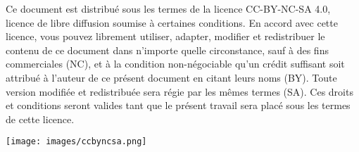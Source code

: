 \vspace{12cm}


Ce document est distribu\'{e} sous les termes de la licence CC-BY-NC-SA 4.0, licence de libre diffusion soumise à certaines conditions. En accord avec cette licence, vous pouvez librement utiliser, adapter, modifier et redistribuer le contenu de ce document dans n'importe quelle circonstance, sauf à des fins commerciales (NC), et à la condition non-n\'{e}gociable qu’un cr\'{e}dit suffisant soit attribu\'{e} à l'auteur de ce pr\'{e}sent document en citant leurs noms (BY). Toute version modifi\'{e}e et redistribu\'{e}e sera r\'{e}gie par les m\^{e}mes termes (SA). Ces droits et conditions seront valides tant que le pr\'{e}sent travail sera plac\'{e} sous les termes de cette licence.

\begin{center}
\texttt{[image: images/ccbyncsa.png]}
\end{center}


\newpage
